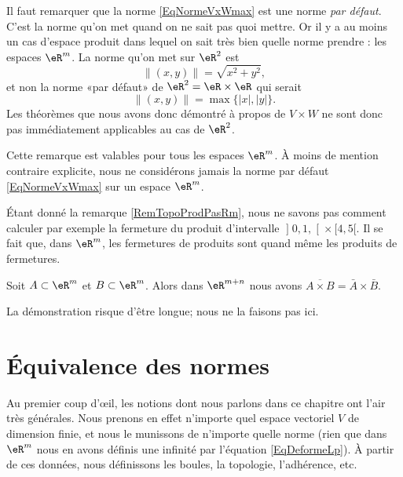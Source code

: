 \begin{remark}		\label{RemTopoProdPasRm}
	Il faut remarquer que la norme \eqref{EqNormeVxWmax} est une norme \emph{par défaut}. C'est la norme qu'on met quand on ne sait pas quoi mettre. Or il y a au moins un cas d'espace produit dans lequel on sait très bien quelle norme prendre : les espaces $\eR^m$. La norme qu'on met sur $\eR^2$ est
	\begin{equation}
		\| (x,y) \|=\sqrt{x^2+y^2},
	\end{equation}
	et non la norme «par défaut» de $\eR^2=\eR\times\eR$ qui serait
	\begin{equation}
		\| (x,y) \|=\max\{ | x |,| y | \}.
	\end{equation}
	Les théorèmes que nous avons donc démontré à propos de $V\times W$ ne sont donc pas immédiatement applicables au cas de $\eR^2$.

	Cette remarque est valables pour tous les espaces $\eR^m$. À moins de mention contraire explicite, nous ne considérons jamais la norme par défaut \eqref{EqNormeVxWmax} sur un espace $\eR^m$.
\end{remark}

Étant donné la remarque \ref{RemTopoProdPasRm}, nous ne savons pas comment calculer par exemple la fermeture du produit d'intervalle $\mathopen] 0,1 ,  \mathclose[\times\mathopen[ 4 , 5 [$. Il se fait que, dans $\eR^m$, les fermetures de produits sont quand même les produits de fermetures.

\begin{proposition}		\label{PropovlAxBbarAbraB}
	Soit $A\subset\eR^m$ et $B\subset\eR^m$. Alors dans $\eR^{m+n}$ nous avons $\overline{ A\times B }=\bar A\times \bar B$.
\end{proposition}

La démonstration risque d'être longue; nous ne la faisons pas ici.

\section{Équivalence des normes}
\label{normes_equiv}

Au premier coup d'œil, les notions dont nous parlons dans ce chapitre ont l'air très générales. Nous prenons en effet n'importe quel espace vectoriel $V$ de dimension finie, et nous le munissons de n'importe quelle norme (rien que dans $\eR^m$ nous en avons définis une infinité par l'équation \eqref{EqDeformeLp}). À partir de ces données, nous définissons les boules, la topologie, l'adhérence, etc.

